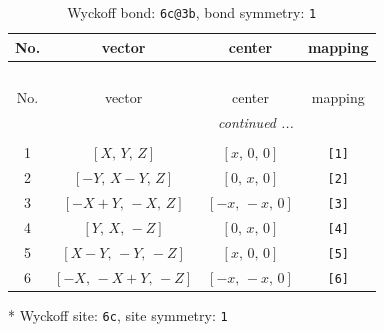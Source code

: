 \documentclass[fleqn,8pt]{jsarticle}
\begin{document}
\renewcommand{\arraystretch}{1.2}
\begin{longtable}{cccc}
\caption{Wyckoff bond: {\tt 6c@3b}, bond symmetry: {\tt 1}}
 \\
 \hline \hline
No. & vector & center & mapping \\ \hline \endfirsthead

\multicolumn{3}{l}{\tablename\ \thetable{}} \\
 \hline \hline
No. & vector & center & mapping \\ \hline \endhead

 \hline \hline
\multicolumn{3}{r}{\footnotesize\it continued ...} \\ \endfoot

 \hline \hline
\multicolumn{3}{r}{} \\ \endlastfoot

1 & $\left[ X,\, Y,\, Z \right]$ & $\left[ x,\, 0,\, 0 \right]$ & {\tt [1]} \\ \hline
2 & $\left[ - Y,\, X - Y,\, Z \right]$ & $\left[ 0,\, x,\, 0 \right]$ & {\tt [2]} \\ \hline
3 & $\left[ - X + Y,\, - X,\, Z \right]$ & $\left[ - x,\, - x,\, 0 \right]$ & {\tt [3]} \\ \hline
4 & $\left[ Y,\, X,\, - Z \right]$ & $\left[ 0,\, x,\, 0 \right]$ & {\tt [4]} \\ \hline
5 & $\left[ X - Y,\, - Y,\, - Z \right]$ & $\left[ x,\, 0,\, 0 \right]$ & {\tt [5]} \\ \hline
6 & $\left[ - X,\, - X + Y,\, - Z \right]$ & $\left[ - x,\, - x,\, 0 \right]$ & {\tt [6]} \\
\end{longtable}
* Wyckoff site: {\tt 6c}, site symmetry: {\tt 1}
\renewcommand{\arraystretch}{1.2}
\end{document}
